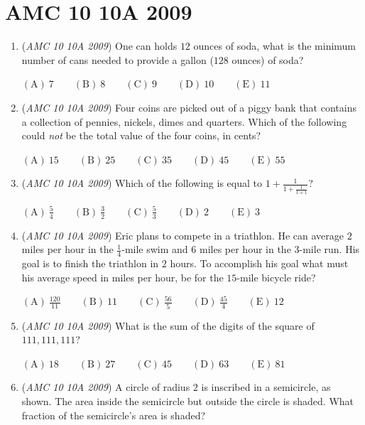 \section{AMC 10 10A 2009}
        \begin{enumerate}
        	\item (\textit{AMC 10 10A 2009}) One can holds $12$ ounces of soda, what is the minimum number of cans needed to provide a gallon ($128$ ounces) of soda?


 $\mathrm{(A)}\ 7 \qquad \mathrm{(B)}\ 8 \qquad \mathrm{(C)}\ 9 \qquad \mathrm{(D)}\ 10 \qquad \mathrm{(E)}\ 11$


	\item (\textit{AMC 10 10A 2009}) Four coins are picked out of a  piggy bank that contains a collection of pennies, nickels, dimes and quarters. Which of the following could \textit{not} be the total value of the four coins, in cents?


 $\mathrm{(A)}\ 15 \qquad \mathrm{(B)}\ 25 \qquad \mathrm{(C)}\ 35 \qquad \mathrm{(D)}\ 45 \qquad \mathrm{(E)}\ 55$


	\item (\textit{AMC 10 10A 2009}) Which of the following is equal to $1 + \frac{1}{1+\frac{1}{1+1}}$?


 $\mathrm{(A)}\ \frac{5}{4} \qquad \mathrm{(B)}\ \frac{3}{2} \qquad \mathrm{(C)}\ \frac{5}{3} \qquad \mathrm{(D)}\ 2 \qquad \mathrm{(E)}\ 3$


	\item (\textit{AMC 10 10A 2009}) Eric plans to compete in a triathlon. He can average $2$ miles per hour in the $\frac{1}{4}$-mile swim and $6$ miles per hour in the $3$-mile run. His goal is to finish the triathlon in $2$ hours. To accomplish his goal what must his average speed in miles per hour, be for the $15$-mile bicycle ride?


 $\mathrm{(A)}\ \frac{120}{11} \qquad \mathrm{(B)}\ 11 \qquad \mathrm{(C)}\ \frac{56}{5} \qquad \mathrm{(D)}\ \frac{45}{4} \qquad \mathrm{(E)}\ 12$


	\item (\textit{AMC 10 10A 2009}) What is the sum of the digits of the square of $111,111,111$?


 $\mathrm{(A)}\ 18 \qquad \mathrm{(B)}\ 27 \qquad \mathrm{(C)}\ 45 \qquad \mathrm{(D)}\ 63 \qquad \mathrm{(E)}\ 81$


	\item (\textit{AMC 10 10A 2009}) A circle of radius $2$ is inscribed in a semicircle, as shown. The area inside the semicircle but outside the circle is shaded. What fraction of the semicircle's area is shaded? 



\end{enumerate}
